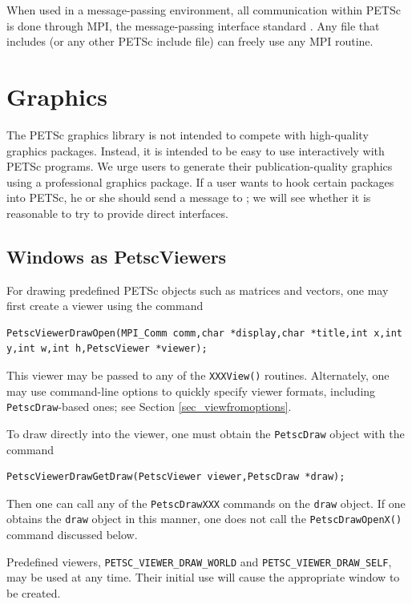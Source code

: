 {{{When used in a message-passing environment, all communication 
within
PETSc is done through MPI, the message-passing interface standard
\cite{MPI-final}.  Any file that includes  (or any other
PETSc include file) can freely use any MPI routine.

\section{Graphics}
\label{sec_graphics}

The PETSc graphics library is not intended to compete with
high-quality graphics packages.  Instead, it is intended to be
easy to use interactively with PETSc programs. We urge users
to generate their publication-quality graphics using a
professional graphics package. If a user wants to hook
certain packages into PETSc, he or she should send a message to
\href{mailto:petsc-maint@mcs.anl.gov}{};
we will see whether it is reasonable to try to provide direct interfaces.

\subsection{Windows as PetscViewers}
For drawing predefined PETSc objects such as matrices and vectors, one may
first create a viewer using the
command
\begin{lstlisting}
PetscViewerDrawOpen(MPI_Comm comm,char *display,char *title,int x,int y,int w,int h,PetscViewer *viewer);
\end{lstlisting}
This viewer may be passed to any of the \lstinline{XXXView()} routines.
Alternately, one may use command-line options to quickly specify viewer formats, 
including \lstinline{PetscDraw}-based ones; see Section \ref{sec_viewfromoptions}.

To draw directly into the viewer, one must obtain the \lstinline{PetscDraw} object with the
command
\begin{lstlisting}
PetscViewerDrawGetDraw(PetscViewer viewer,PetscDraw *draw);
\end{lstlisting}
Then one can call any of the \lstinline{PetscDrawXXX} commands on the \lstinline{draw}
object. If one obtains the \lstinline{draw} object in this manner,
one does not call the \lstinline{PetscDrawOpenX()} command discussed below.

Predefined viewers, \lstinline{PETSC_VIEWER_DRAW_WORLD}
and \lstinline{PETSC_VIEWER_DRAW_SELF}, may be used at any time. Their initial
use will cause the appropriate window to be created.

}}}
